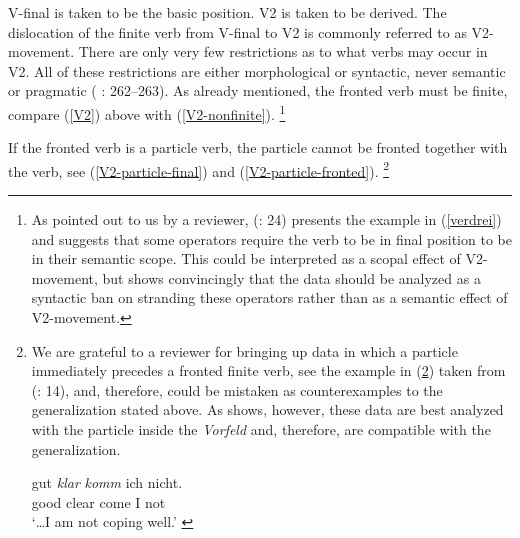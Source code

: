 \documentclass[output=paper]{langsci/langscibook}
\begin{document}
V-final is taken to be the basic position. V2 is taken to be derived. The dislocation of the finite verb from V-final to V2 is commonly referred to as  V2-movement. There are only very few restrictions as to what verbs may occur in V2. All of these restrictions are either morphological or syntactic, never semantic or pragmatic (\citeauthor{Schenk:95} \citeyear{Schenk:95}: 262--263). As already mentioned, the fronted verb must be finite, compare (\ref{V2}) above with (\ref{V2-nonfinite}).%
\footnote{As pointed out to us by a reviewer, \citeauthor{Haider:97} (\citeyear{Haider:97}: 24) presents the example in (\ref{verdrei}) and suggests that some operators require the verb to be in final position to be in their semantic scope. This could be interpreted as a scopal effect of V2-movement, but \cite{Meinunger:01} shows convincingly that the data should be analyzed as a syntactic ban on stranding these operators rather than as a semantic effect of V2-movement.

\ea
{}
\z
\zlast

}

\begin{exe}
\end{exe}

If the fronted verb is a particle verb, the particle cannot be fronted together with the verb, 
see (\ref{V2-particle-final}) and (\ref{V2-particle-fronted}).%
\footnote{We are grateful to a reviewer for bringing up data in which a particle immediately precedes a fronted finite verb, see the example in (\ref{gut klar}) taken from \citeauthor{Mueller:05} (\citeyear{Mueller:05}: 14), and, therefore, could be mistaken as counterexamples to the generalization stated above. As \cite{Mueller:05} shows, however, these data are best analyzed with the particle inside the \textit{Vorfeld} and, therefore, are compatible with the generalization.

\ea
\gll {\ldots} gut \textit{klar} \textit{komm} ich nicht. \\
{} good clear come I not \\
\glt `\ldots\@ I am not coping well.' \label{gut klar}
\zlast

}
\end{document}
